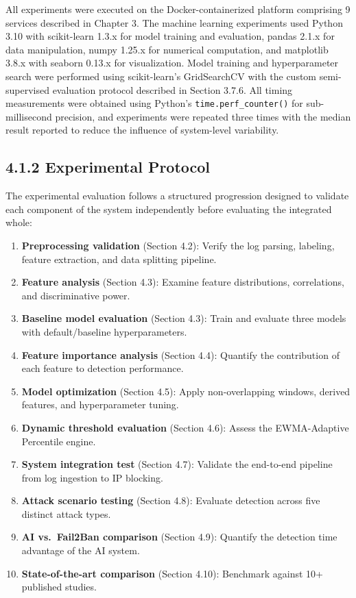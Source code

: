 \documentclass[
  a4paper]{report}
\providecommand{\tightlist}{%
  \setlength{\itemsep}{0pt}\setlength{\parskip}{0pt}}
\begin{document}
All experiments were executed on the Docker-containerized platform
comprising 9 services described in Chapter 3. The machine learning
experiments used Python 3.10 with scikit-learn 1.3.x for model training
and evaluation, pandas 2.1.x for data manipulation, numpy 1.25.x for
numerical computation, and matplotlib 3.8.x with seaborn 0.13.x for
visualization. Model training and hyperparameter search were performed
using scikit-learn's GridSearchCV with the custom semi-supervised
evaluation protocol described in Section 3.7.6. All timing measurements
were obtained using Python's \texttt{time.perf\_counter()} for
sub-millisecond precision, and experiments were repeated three times
with the median result reported to reduce the influence of system-level
variability.

\subsection{4.1.2 Experimental Protocol}\label{experimental-protocol}

The experimental evaluation follows a structured progression designed to
validate each component of the system independently before evaluating
the integrated whole:

\begin{enumerate}
\def\labelenumi{\arabic{enumi}.}
\tightlist
\item
  \textbf{Preprocessing validation} (Section 4.2): Verify the log
  parsing, labeling, feature extraction, and data splitting pipeline.
\item
  \textbf{Feature analysis} (Section 4.3): Examine feature
  distributions, correlations, and discriminative power.
\item
  \textbf{Baseline model evaluation} (Section 4.3): Train and evaluate
  three models with default/baseline hyperparameters.
\item
  \textbf{Feature importance analysis} (Section 4.4): Quantify the
  contribution of each feature to detection performance.
\item
  \textbf{Model optimization} (Section 4.5): Apply non-overlapping
  windows, derived features, and hyperparameter tuning.
\item
  \textbf{Dynamic threshold evaluation} (Section 4.6): Assess the
  EWMA-Adaptive Percentile engine.
\item
  \textbf{System integration test} (Section 4.7): Validate the
  end-to-end pipeline from log ingestion to IP blocking.
\item
  \textbf{Attack scenario testing} (Section 4.8): Evaluate detection
  across five distinct attack types.
\item
  \textbf{AI vs.~Fail2Ban comparison} (Section 4.9): Quantify the
  detection time advantage of the AI system.
\item
  \textbf{State-of-the-art comparison} (Section 4.10): Benchmark against
  10+ published studies.
\end{enumerate}
\end{document}
